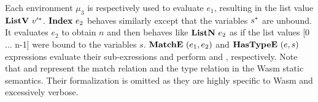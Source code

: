 Each environment $\mu_3$ is respectively used to evaluate $e_1$, resulting in
the list value $\textbf{ListV} ~ v'^*$.
$\textbf{Index} ~ e_2${} behaves similarly except that the variables $s^*$ are
unbound.
It evaluates $e_2$ to obtain $n$ and then behaves like $\textbf{ListN} ~ e_2${} as
if the list values [0 ... n-1] were bound to the variables $s$.
$\textbf{MatchE} ~ (e_1, e_2)${} and $\textbf{HasTypeE} ~ (e, s)${} expressions evaluate their
sub-exressions and perform \match{} and \hastype{}, respectively.
Note that \match{} and \hastype{} represent the match relation and the type
relation in the Wasm static semantics.
Their formalization is omitted as they are highly specific to Wasm and
excessively verbose.





